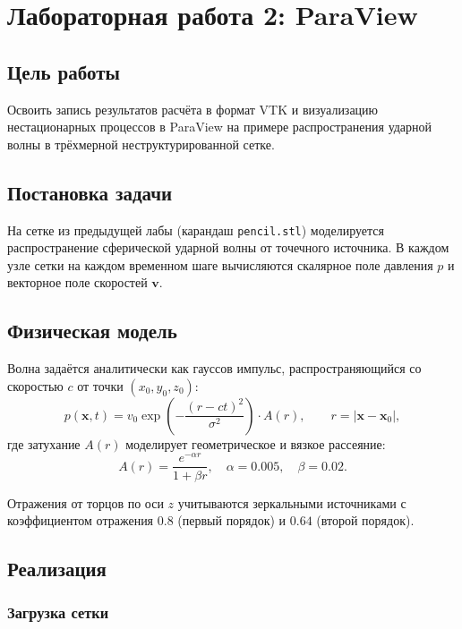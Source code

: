 \section{Лабораторная работа \textnumero{}2: ParaView}

\subsection{Цель работы}

Освоить запись результатов расчёта в формат VTK и визуализацию
нестационарных процессов в ParaView на примере распространения
ударной волны в трёхмерной неструктурированной сетке.

\subsection{Постановка задачи}

На сетке из предыдущей лабы (карандаш \texttt{pencil.stl}) моделируется
распространение сферической ударной волны от точечного источника.
В каждом узле сетки на каждом временном шаге вычисляются скалярное
поле давления $p$ и векторное поле скоростей $\mathbf{v}$.

\subsection{Физическая модель}

Волна задаётся аналитически как гауссов импульс, распространяющийся
со скоростью $c$ от точки $(x_0, y_0, z_0)$:
\begin{equation}
  p(\mathbf{x}, t) = v_0
    \exp\!\left(-\frac{(r - ct)^2}{\sigma^2}\right)
    \cdot A(r),
  \qquad r = |\mathbf{x} - \mathbf{x}_0|,
\end{equation}
где затухание $A(r)$ моделирует геометрическое и вязкое рассеяние:
\begin{equation}
  A(r) = \frac{e^{-\alpha r}}{1 + \beta r},
  \quad \alpha = 0.005,\quad \beta = 0.02.
\end{equation}

Отражения от торцов по оси $z$ учитываются зеркальными источниками
с коэффициентом отражения $0.8$ (первый порядок) и $0.64$ (второй порядок).

\subsection{Реализация}

\subsubsection{Загрузка сетки}

